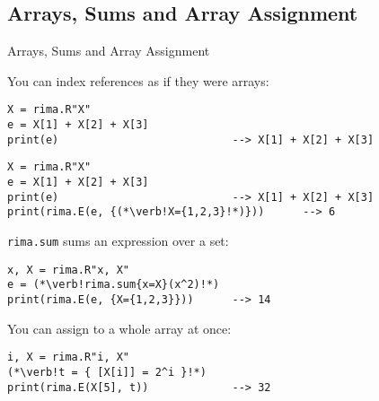 \documentclass[smaller,handout]{beamer}
\begin{document}
\subsection{Arrays, Sums and Array Assignment}
\begin{frame}[fragile]{Arrays, Sums and Array Assignment}

  You can index references as if they were arrays:%
  \vspace{-2ex}
  \begin{overprint}%
%
  \begin{lstlisting}
X = rima.R"X"
e = X[1] + X[2] + X[3]
print(e)                           --> X[1] + X[2] + X[3]
  \end{lstlisting}%
%
  \begin{lstlisting}
X = rima.R"X"
e = X[1] + X[2] + X[3]
print(e)                           --> X[1] + X[2] + X[3]
print(rima.E(e, {(*\verb!X={1,2,3}!*)}))      --> 6
  \end{lstlisting}
%  
  \end{overprint} 
  \pause\pause
  \vspace{-1ex}

  \lstinline!rima.sum! sums an expression over a set:
  \begin{lstlisting}
x, X = rima.R"x, X"
e = (*\verb!rima.sum{x=X}(x^2)!*)
print(rima.E(e, {X={1,2,3}}))      --> 14
  \end{lstlisting}
  \pause

  You can assign to a whole array at once:
  \begin{lstlisting}
i, X = rima.R"i, X"
(*\verb!t = { [X[i]] = 2^i }!*)
print(rima.E(X[5], t))             --> 32
  \end{lstlisting}

\end{frame}


\begin{comment}
\begin{frame}[fragile]{Array Assignment}

  You can assign to a whole array at once:
  \begin{lstlisting}
(*\verb!t = { [X[i]] = 2^i }!*)
print(rima.E(X[5], t))             --> 32
  \end{lstlisting}
  \vspace{\stretch{1}}\pause

  Of course, you can sum over such an array:
  \begin{lstlisting}
e = rima.sum{i=C}(C[i] * p[i])
print(rima.E(e, {C={3,5,7}, (*\verb![p[i]] = x^i!*)})
  --> 3*x + 5*x^2 + 7*x^3
  \end{lstlisting}
  
  \vspace{\stretch{1}}
  You can use the same construct to set bounds on a variable
\end{frame}
\end{comment}
\end{document}

